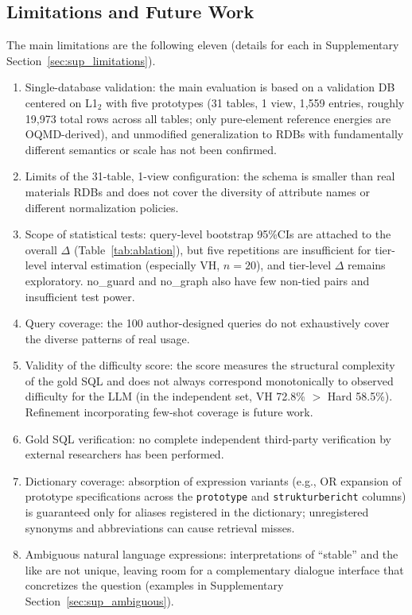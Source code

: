 \subsection{Limitations and Future Work}

The main limitations are the following eleven (details for each in Supplementary Section~\ref{sec:sup_limitations}).
\begin{enumerate}[nosep]
  \item Single-database validation: the main evaluation is based on a validation DB centered on L1$_2$ with five prototypes (31 tables, 1 view, 1{,}559 entries, roughly 19{,}973 total rows across all tables; only pure-element reference energies are OQMD-derived), and unmodified generalization to RDBs with fundamentally different semantics or scale has not been confirmed.
  \item Limits of the 31-table, 1-view configuration: the schema is smaller than real materials RDBs and does not cover the diversity of attribute names or different normalization policies.
  \item Scope of statistical tests: query-level bootstrap 95\%CIs are attached to the overall $\Delta$ (Table~\ref{tab:ablation}), but five repetitions are insufficient for tier-level interval estimation (especially VH, $n=20$), and tier-level $\Delta$ remains exploratory. no\_guard and no\_graph also have few non-tied pairs and insufficient test power.
  \item Query coverage: the 100 author-designed queries do not exhaustively cover the diverse patterns of real usage.
  \item Validity of the difficulty score: the score measures the structural complexity of the gold SQL and does not always correspond monotonically to observed difficulty for the LLM (in the independent set, VH 72.8\% $>$ Hard 58.5\%). Refinement incorporating few-shot coverage is future work.
  \item Gold SQL verification: no complete independent third-party verification by external researchers has been performed.
  \item Dictionary coverage: absorption of expression variants (e.g., OR expansion of prototype specifications across the \texttt{prototype} and \texttt{strukturbericht} columns) is guaranteed only for aliases registered in the dictionary; unregistered synonyms and abbreviations can cause retrieval misses.
  \item Ambiguous natural language expressions: interpretations of ``stable'' and the like are not unique, leaving room for a complementary dialogue interface that concretizes the question (examples in Supplementary Section~\ref{sec:sup_ambiguous}).

\end{enumerate}
